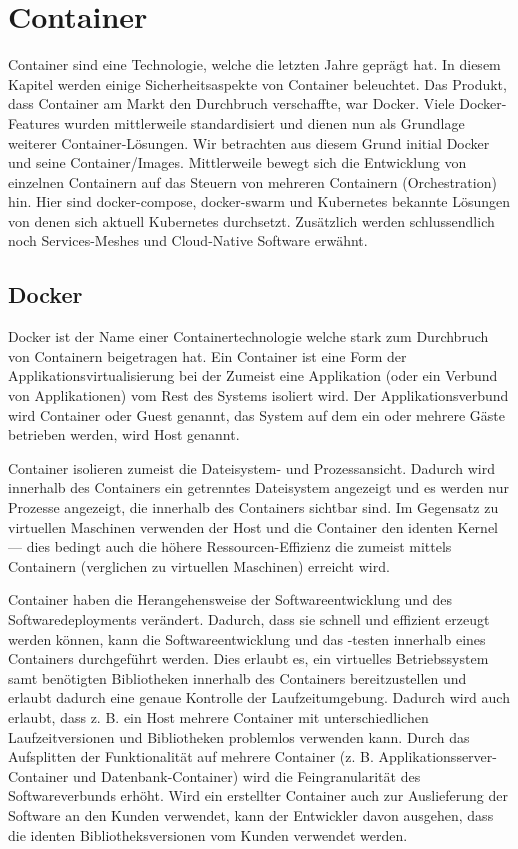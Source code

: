 \part{Container}

Container sind eine Technologie, welche die letzten Jahre geprägt hat. In diesem Kapitel werden einige Sicherheitsaspekte von Container beleuchtet. Das Produkt, dass Container am Markt den Durchbruch verschaffte, war Docker. Viele Docker-Features wurden mittlerweile standardisiert und dienen nun als Grundlage weiterer Container-Lösungen. Wir betrachten aus diesem Grund initial Docker und seine Container/Images. Mittlerweile bewegt sich die Entwicklung von einzelnen Containern auf das Steuern von mehreren Containern (Orchestration) hin. Hier sind docker-compose, docker-swarm und Kubernetes bekannte Lösungen von denen sich aktuell Kubernetes durchsetzt. Zusätzlich werden schlussendlich noch Services-Meshes und Cloud-Native Software erwähnt.

\chapter{Docker}

Docker ist der Name einer Containertechnologie welche stark zum Durchbruch von Containern beigetragen hat. Ein Container ist eine Form der Applikationsvirtualisierung bei der Zumeist eine Applikation (oder ein Verbund von Applikationen) vom Rest des Systems isoliert wird. Der Applikationsverbund wird Container oder Guest genannt, das System auf dem ein oder mehrere Gäste betrieben werden, wird Host genannt.

Container isolieren zumeist die Dateisystem- und Prozessansicht. Dadurch wird innerhalb des Containers ein getrenntes Dateisystem angezeigt und es werden nur Prozesse angezeigt, die innerhalb des Containers sichtbar sind. Im Gegensatz zu virtuellen Maschinen verwenden der Host und die Container den identen Kernel --- dies bedingt auch die höhere Ressourcen-Effizienz die zumeist mittels Containern (verglichen zu virtuellen Maschinen) erreicht wird.

Container haben die Herangehensweise der Softwareentwicklung und des Softwaredeployments verändert. Dadurch, dass sie schnell und effizient erzeugt werden können, kann die Softwareentwicklung und das -testen innerhalb eines Containers durchgeführt werden. Dies erlaubt es, ein virtuelles Betriebssystem samt benötigten Bibliotheken innerhalb des Containers bereitzustellen und erlaubt dadurch eine genaue Kontrolle der Laufzeitumgebung. Dadurch wird auch erlaubt, dass z. B. ein Host mehrere Container mit unterschiedlichen Laufzeitversionen und Bibliotheken problemlos verwenden kann. Durch das Aufsplitten der Funktionalität auf mehrere Container (z. B. Applikationsserver-Container und Datenbank-Container) wird die Feingranularität des Softwareverbunds erhöht. Wird ein erstellter Container auch zur Auslieferung der Software an den Kunden verwendet, kann der Entwickler davon ausgehen, dass die identen Bibliotheksversionen vom Kunden verwendet werden.

